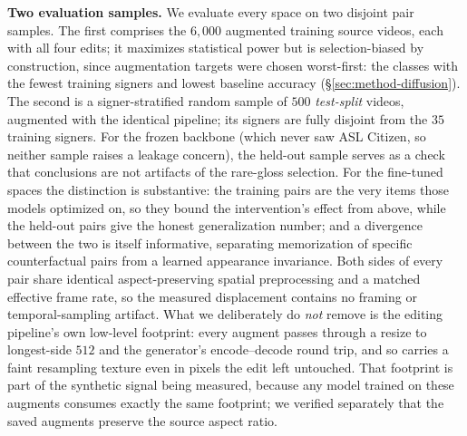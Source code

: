 \textbf{Two evaluation samples.} We evaluate every space on two disjoint
pair samples. The first comprises the $6{,}000$ augmented training source
videos, each with all four edits; it maximizes statistical power but is
selection-biased by construction, since augmentation targets were chosen
worst-first: the classes with the fewest training signers and lowest
baseline accuracy (\S\ref{sec:method-diffusion}). The second is a
signer-stratified random sample of $500$ \emph{test-split} videos, augmented
with the identical pipeline; its signers are fully disjoint from the $35$
training signers. For the frozen backbone (which never saw ASL Citizen,
so neither sample raises a leakage concern), the held-out sample serves as
a check that conclusions are not artifacts of the rare-gloss selection. For
the fine-tuned spaces the distinction is substantive: the training pairs are
the very items those models optimized on, so they bound the intervention's
effect from above, while the held-out pairs give the honest generalization
number; and a divergence between the two is itself informative,
separating memorization of specific counterfactual pairs from a learned
appearance invariance. Both sides of every pair share identical
aspect-preserving spatial preprocessing and a matched effective frame rate,
so the measured displacement contains no framing or temporal-sampling
artifact. What we deliberately do \emph{not} remove is the editing
pipeline's own low-level footprint: every augment passes through a resize to
longest-side $512$ and the generator's encode--decode round trip, and so
carries a faint resampling texture even in pixels the edit left untouched.
That footprint is part of the synthetic signal being measured, because any
model trained on these augments consumes exactly the same footprint; we
verified separately that the saved augments preserve the source aspect
ratio.

